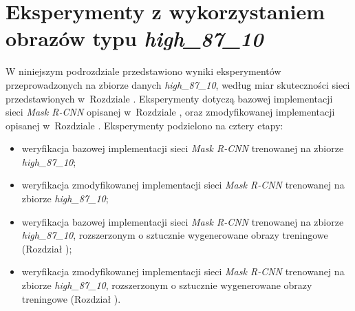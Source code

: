 \section{Eksperymenty z wykorzystaniem obrazów typu \textit{high\_87\_10}}
\label{sec:experymenty_high}
W niniejszym podrozdziale przedstawiono wyniki eksperymentów przeprowadzonych na zbiorze danych \textit{high\_87\_10}, według miar skuteczności sieci przedstawionych w~Rozdziale .
Eksperymenty dotyczą bazowej implementacji sieci \textit{Mask R-CNN} \cite{matterport-mask-rcnn} opisanej w~Rozdziale , oraz zmodyfikowanej implementacji opisanej w~Rozdziale .
Eksperymenty podzielono na cztery etapy:

\begin{itemize}
 \item weryfikacja bazowej implementacji sieci \textit{Mask R-CNN} trenowanej na zbiorze \textit{high\_87\_10};
 \item weryfikacja zmodyfikowanej implementacji sieci \textit{Mask R-CNN} trenowanej na zbiorze \textit{high\_87\_10};
 \item weryfikacja bazowej implementacji sieci \textit{Mask R-CNN} trenowanej na zbiorze \textit{high\_87\_10}, rozszerzonym o sztucznie wygenerowane obrazy treningowe (Rozdział );
 \item weryfikacja zmodyfikowanej implementacji sieci \textit{Mask R-CNN} trenowanej na zbiorze \textit{high\_87\_10}, rozszerzonym o sztucznie wygenerowane obrazy treningowe (Rozdział ).
\end{itemize}
